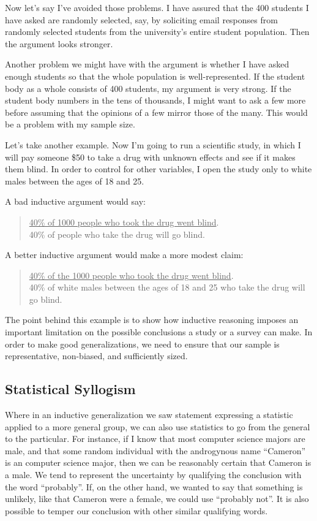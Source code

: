 Now let's say I've avoided those problems. I have
assured that the 400 students I have asked are randomly selected, say, by soliciting email responses from
randomly selected students from the university's entire
student population. Then the argument looks stronger.

Another problem we might have with the
argument is whether I have asked enough students so
that the whole population is well-represented. If the
student body as a whole consists of 400 students, my
argument is very strong. If the student body numbers
in the tens of thousands, I might want to ask a few
more before assuming that the opinions of a few mirror those of the many. This would be a problem with
my sample size.

Let's take another example. Now I'm going to run
a scientific study, in which I will pay someone \$50 to
take a drug with unknown effects and see if it makes
them blind. In order to control for other variables, I
open the study only to white males between the ages
of 18 and 25.

A bad inductive argument would say:

\begin{quote}
\underline{40\% of 1000 people who took the drug went blind}. \\
40\% of people who take the drug will go blind. \\
\end{quote}

A better inductive argument would make a more
modest claim:

\begin{quote}
\underline{40\% of the 1000 people who took the drug went blind}. \\
40\% of white males between the ages of 18 and 25 who take the drug will go blind. \\
\end{quote}
    
The point behind this example is to show how inductive reasoning imposes an important limitation on
the possible conclusions a study or a survey can make.
In order to make good generalizations, we need to
ensure that our sample is representative, non-biased,
and sufficiently sized.


\subsection{Statistical Syllogism}

Where in an inductive generalization we saw statement expressing a statistic applied to a more general
group, we can also use statistics to go from the general
to the particular. For instance, if I know that most computer science majors are male, and that some random
individual with the androgynous name ``Cameron'' is
an computer science major, then we can be reasonably
certain that Cameron is a male. We tend to represent
the uncertainty by qualifying the conclusion with the
word ``probably''. If, on the other hand, we wanted to
say that something is unlikely, like that Cameron
were a female, we could use ``probably not''. It is also
possible to temper our conclusion with other similar
qualifying words.


